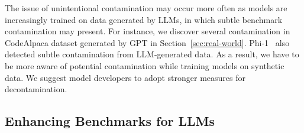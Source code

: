 The issue of unintentional contamination may occur more often as models are increasingly trained on data generated by LLMs, in which subtle benchmark contamination may present.
For instance, we discover several contamination in CodeAlpaca dataset generated by GPT in Section~\ref{sec:real-world}.
Phi-1~\citep{gunasekar2023textbooks} also detected subtle contamination from LLM-generated data.
As a result, we have to be more aware of potential contamination while training models on synthetic data. 
We suggest model developers to adopt stronger measures for decontamination.


\subsection{Enhancing Benchmarks for LLMs}

